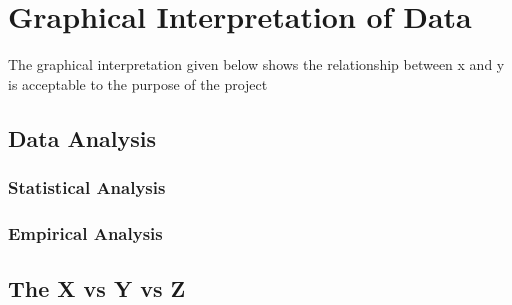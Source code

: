 \chapter{Graphical Interpretation of Data}\label{app:insset}
The graphical interpretation given below shows the relationship between x and y is acceptable to the purpose of the project

\section{Data Analysis}

\subsection{Statistical Analysis}
\subsection{Empirical  Analysis}

\section{The X vs Y vs Z}



